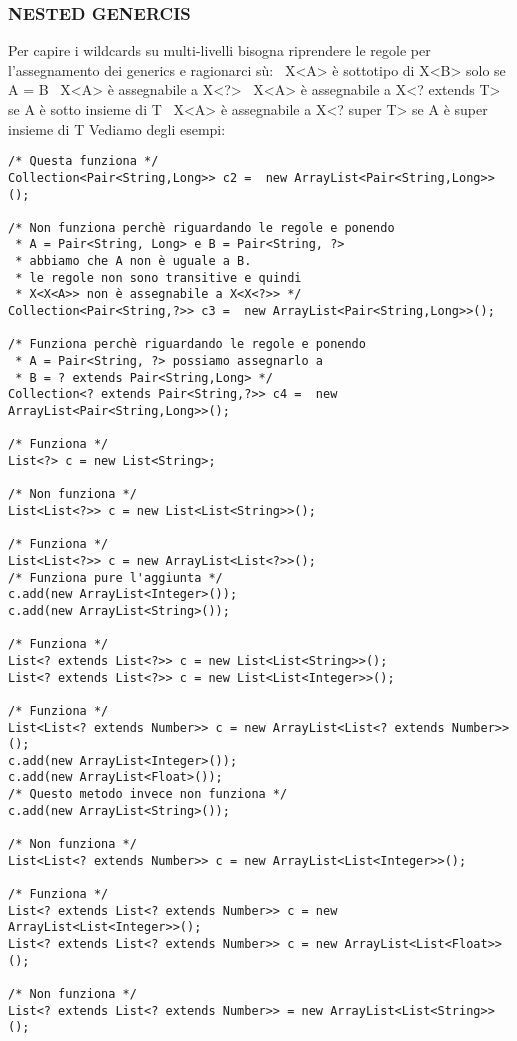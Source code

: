 \subsubsection{NESTED GENERCIS}
\noindent Per capire i wildcards su multi-livelli bisogna riprendere le regole per l'assegnamento dei generics e ragionarci sù:\newline
\textbullet\ X<A> è sottotipo di X<B> solo se A = B \newline
\textbullet\ X<A> è assegnabile a X<?> \newline
\textbullet\ X<A> è assegnabile a X<? extends T> se A è sotto insieme di T \newline
\textbullet\ X<A> è assegnabile a X<? super T> se A è super insieme di T \newline
\noindent Vediamo degli esempi:
\begin{lstlisting}
/* Questa funziona */
Collection<Pair<String,Long>> c2 =  new ArrayList<Pair<String,Long>>(); 

/* Non funziona perchè riguardando le regole e ponendo
 * A = Pair<String, Long> e B = Pair<String, ?>
 * abbiamo che A non è uguale a B.
 * le regole non sono transitive e quindi 
 * X<X<A>> non è assegnabile a X<X<?>> */
Collection<Pair<String,?>> c3 =  new ArrayList<Pair<String,Long>>(); 

/* Funziona perchè riguardando le regole e ponendo
 * A = Pair<String, ?> possiamo assegnarlo a
 * B = ? extends Pair<String,Long> */
Collection<? extends Pair<String,?>> c4 =  new ArrayList<Pair<String,Long>>(); 

/* Funziona */
List<?> c = new List<String>;

/* Non funziona */
List<List<?>> c = new List<List<String>>();

/* Funziona */
List<List<?>> c = new ArrayList<List<?>>();
/* Funziona pure l'aggiunta */
c.add(new ArrayList<Integer>());
c.add(new ArrayList<String>());

/* Funziona */
List<? extends List<?>> c = new List<List<String>>();
List<? extends List<?>> c = new List<List<Integer>>();

/* Funziona */
List<List<? extends Number>> c = new ArrayList<List<? extends Number>>();
c.add(new ArrayList<Integer>());
c.add(new ArrayList<Float>());
/* Questo metodo invece non funziona */
c.add(new ArrayList<String>());   

/* Non funziona */
List<List<? extends Number>> c = new ArrayList<List<Integer>>(); 

/* Funziona */
List<? extends List<? extends Number>> c = new ArrayList<List<Integer>>();
List<? extends List<? extends Number>> c = new ArrayList<List<Float>>();

/* Non funziona */
List<? extends List<? extends Number>> = new ArrayList<List<String>>(); 
\end{lstlisting}

